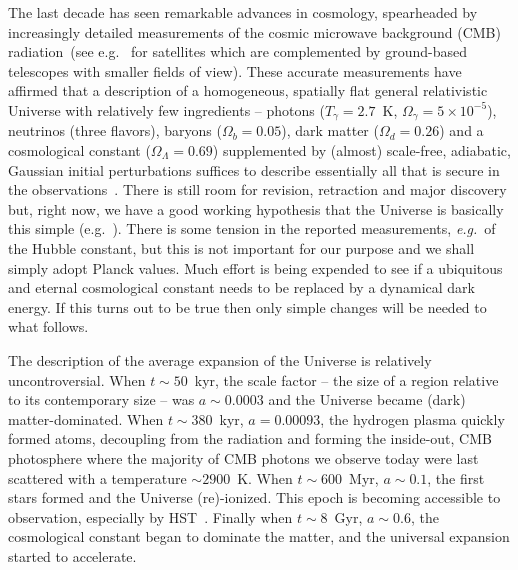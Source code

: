 \documentclass[psfig,12pt]{article}
\def\eg{{\it e.g.}\ }
\def\ni{\noindent}
\begin{document}
\ni{\bf Our Universe's Contents:}
The last decade has seen remarkable advances in cosmology, spearheaded
by increasingly detailed measurements of the cosmic microwave background
(CMB) radiation~(see e.g.~\cite{WMAP2013maps, WMAP2013cosmopara, Planck2015maps, Planck2015cosmopara} for satellites which are complemented by ground-based telescopes with smaller fields of view).
These accurate measurements have affirmed that a description of a
homogeneous, spatially flat general relativistic Universe with
relatively few ingredients -- photons ($T_\gamma=2.7$~K, $\Omega_\gamma=5\times10^{-5}$), neutrinos
(three flavors), baryons ($\Omega_b=0.05$), dark matter
($\Omega_d=0.26$) and a cosmological constant ($\Omega_\Lambda=0.69$)
supplemented by (almost) scale-free, adiabatic, Gaussian initial
perturbations suffices to describe essentially all that is secure in the
observations~\cite{Planck2015cosmopara}. There is still room for
revision, retraction and major discovery but, right now, we have a good
working hypothesis that the Universe is basically this simple
(e.g.~\cite{Weinberg2008, Schneider2015}). There is some tension in the
reported measurements, \eg of the Hubble constant, but this is not
important for our purpose and we shall simply adopt Planck values. Much
effort is being expended to see if a ubiquitous and eternal cosmological
constant needs to be replaced by a dynamical dark energy. If this turns
out to be true then only simple changes will be needed to what follows.

\ni{\bf Our Universe's Evolution:}
The description of the average expansion of the Universe is relatively
uncontroversial. When  $t\sim 50$~kyr,  the scale factor -- the size of
a region relative to its contemporary size -- was $a\sim0.0003$ and the
Universe became (dark) matter-dominated. When $t\sim380$~kyr,
$a=0.00093$, the hydrogen plasma quickly formed atoms, decoupling from
the radiation and forming the inside-out, CMB photosphere where the
majority of CMB photons we observe today were last scattered with a
temperature $\sim2900$~K. When $t\sim600$~Myr, $a\sim0.1$, the first
stars formed and the Universe (re)-ionized. This epoch is becoming
accessible to observation, especially by HST~\cite{Castellano2016}. Finally when $t\sim8$~Gyr, $a\sim0.6$, the
cosmological constant began to dominate the matter, and the universal
expansion started to accelerate.
\end{document}
